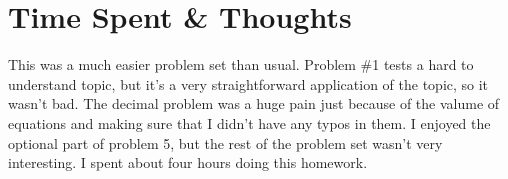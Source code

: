 \documentclass[12pt]{article}
\begin{document}
\section{Time Spent \& Thoughts}

This was a much easier problem set than usual. Problem \#1 tests a hard to understand topic, but it's a very straightforward application of the topic, so it wasn't bad. The decimal problem was a huge pain just because of the valume of equations and making sure that I didn't have any typos in them. I enjoyed the optional part of problem 5, but the rest of the problem set wasn't very interesting. I spent about four hours doing this homework.
\end{document}
